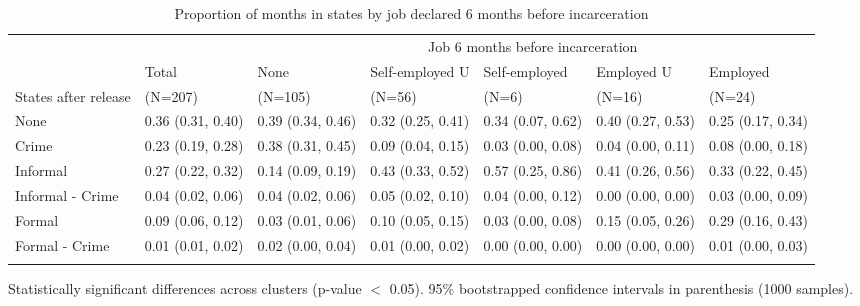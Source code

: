 
\begin{table}[htp]
\renewcommand{\arraystretch}{1.1}
\setlength{\tabcolsep}{6pt}
\centering
\scriptsize
\caption{Proportion of months in states by job declared 6 months before incarceration} 
\label{tab:prejobs-crime}
\begin{threeparttable}
\begin{tabular}{lllllll}
 \hline
 \addlinespace
 & & \multicolumn{5}{c}{Job 6 months before incarceration} \\
 \addlinespace
 \cmidrule(lr){3-7} 
\addlinespace
 & Total & None & Self-employed U & Self-employed & Employed U & Employed \\
States after release  & \multicolumn{1}{l}{(N=207)} & \multicolumn{1}{l}{(N=105)} & \multicolumn{1}{l}{(N=56)} & \multicolumn{1}{l}{(N=6)} &
\multicolumn{1}{l}{(N=16)} & \multicolumn{1}{l}{(N=24)} \\
\addlinespace
  \hline
 \addlinespace
None & 0.36 (0.31, 0.40) & 0.39 (0.34, 0.46) & 0.32 (0.25, 0.41) & 0.34 (0.07, 0.62) & 0.40 (0.27, 0.53) & 0.25 (0.17, 0.34) \\ 
  Crime & 0.23 (0.19, 0.28) & 0.38 (0.31, 0.45) & 0.09 (0.04, 0.15) & 0.03 (0.00, 0.08) & 0.04 (0.00, 0.11) & 0.08 (0.00, 0.18) \\ 
  Informal & 0.27 (0.22, 0.32) & 0.14 (0.09, 0.19) & 0.43 (0.33, 0.52) & 0.57 (0.25, 0.86) & 0.41 (0.26, 0.56) & 0.33 (0.22, 0.45) \\ 
  Informal - Crime & 0.04 (0.02, 0.06) & 0.04 (0.02, 0.06) & 0.05 (0.02, 0.10) & 0.04 (0.00, 0.12) & 0.00 (0.00, 0.00) & 0.03 (0.00, 0.09) \\ 
  Formal & 0.09 (0.06, 0.12) & 0.03 (0.01, 0.06) & 0.10 (0.05, 0.15) & 0.03 (0.00, 0.08) & 0.15 (0.05, 0.26) & 0.29 (0.16, 0.43) \\ 
  Formal - Crime & 0.01 (0.01, 0.02) & 0.02 (0.00, 0.04) & 0.01 (0.00, 0.02) & 0.00 (0.00, 0.00) & 0.00 (0.00, 0.00) & 0.01 (0.00, 0.03) \\ 
  
\addlinespace
   \hline
\end{tabular}
\begin{tablenotes}
\item * Statistically significant differences across clusters (p-value $<$ 0.05). 95\% bootstrapped confidence intervals in parenthesis (1000 samples). 
\end{tablenotes}
\end{threeparttable}
\end{table}
